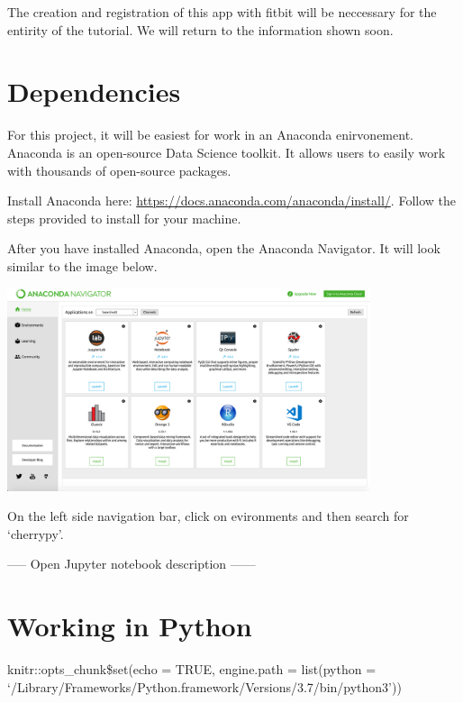 \documentclass[]{book}
\newenvironment{Shaded}{\begin{snugshade}}{\end{snugshade}}
\newcommand{\KeywordTok}[1]{\textcolor[rgb]{0.13,0.29,0.53}{\textbf{#1}}}
\newcommand{\DataTypeTok}[1]{\textcolor[rgb]{0.13,0.29,0.53}{#1}}
\newcommand{\OtherTok}[1]{\textcolor[rgb]{0.56,0.35,0.01}{#1}}
\newcommand{\OperatorTok}[1]{\textcolor[rgb]{0.81,0.36,0.00}{\textbf{#1}}}
\newcommand{\NormalTok}[1]{#1}
\begin{document}
The creation and registration of this app with fitbit will be neccessary
for the entirity of the tutorial. We will return to the information
shown soon.

\chapter{Dependencies}\label{dependencies}

For this project, it will be easiest for work in an Anaconda
enirvonement. Anaconda is an open-source Data Science toolkit. It allows
users to easily work with thousands of open-source packages.

Install Anaconda here:
\url{https://docs.anaconda.com/anaconda/install/}. Follow the steps
provided to install for your machine.

After you have installed Anaconda, open the Anaconda Navigator. It will
look similar to the image below.

\includegraphics[width=0.80000\textwidth]{images/anacondanav.png}

On the left side navigation bar, click on evironments and then search
for `cherrypy'.

----- Open Jupyter notebook description ------

\begin{Shaded}
\end{Shaded}

\chapter{Working in Python}\label{working-in-python}

knitr::opts\_chunk\$set(echo = TRUE, engine.path = list(python =
`/Library/Frameworks/Python.framework/Versions/3.7/bin/python3'))
\end{document}
